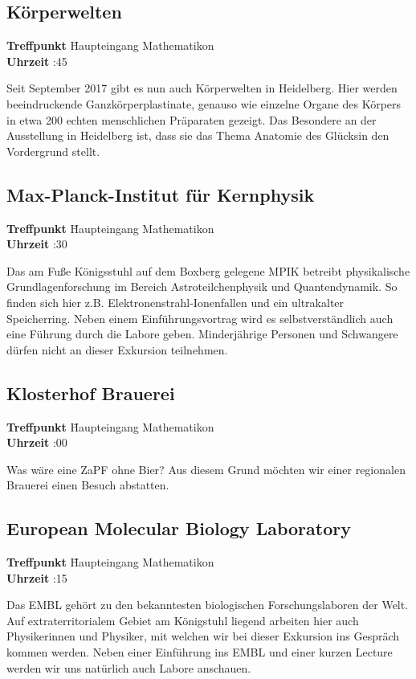 \subsection*{Körperwelten}
\begin{tabbing}
\textbf{Treffpunkt} \quad \quad \quad \= Haupteingang Mathematikon\\
\textbf{Uhrzeit} :45
\end{tabbing}
Seit September 2017 gibt es nun auch Körperwelten in Heidelberg. Hier werden beeindruckende Ganzkörperplastinate, genauso wie einzelne Organe des Körpers in etwa 200 echten menschlichen Präparaten gezeigt. Das Besondere an der Ausstellung in Heidelberg ist, dass sie das Thema \flqq Anatomie des Glücks\frqq in den Vordergrund stellt. 

\subsection*{Max-Planck-Institut für Kernphysik}
\begin{tabbing}
\textbf{Treffpunkt} \quad \quad \quad \= Haupteingang Mathematikon\\
\textbf{Uhrzeit} :30
\end{tabbing}
Das am Fuße Königsstuhl auf dem Boxberg gelegene MPIK betreibt physikalische Grundlagenforschung im Bereich Astroteilchenphysik und Quantendynamik. So finden sich hier z.B. Elektronenstrahl-Ionenfallen und ein ultrakalter Speicherring. Neben einem Einführungsvortrag wird es selbstverständlich auch eine Führung durch die Labore geben. Minderjährige Personen und Schwangere dürfen nicht an dieser Exkursion teilnehmen. 

\subsection*{Klosterhof Brauerei}
\begin{tabbing}
\textbf{Treffpunkt} \quad \quad \quad \= Haupteingang Mathematikon\\
\textbf{Uhrzeit} :00
\end{tabbing}
Was wäre eine ZaPF ohne Bier? Aus diesem Grund möchten wir einer regionalen Brauerei einen Besuch abstatten. 

\subsection*{European Molecular Biology Laboratory}
\begin{tabbing}
\textbf{Treffpunkt} \quad \quad \quad \= Haupteingang Mathematikon \\
\textbf{Uhrzeit} :15
\end{tabbing}
Das EMBL gehört zu den bekanntesten biologischen Forschungslaboren der Welt. Auf extraterritorialem Gebiet am Königstuhl liegend arbeiten hier auch Physikerinnen und Physiker, mit welchen wir bei dieser Exkursion ins Gespräch kommen werden. Neben einer Einführung ins EMBL und einer kurzen \flqq Lecture \frqq werden wir uns natürlich auch Labore anschauen.

